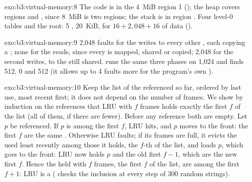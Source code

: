 \begin{solution}{exo:b3:virtual-memory:8}
The code is in the 4~MiB region 1 (); the heap covers regions  and , since 8~MiB is two regions; the stack is in region . Four level-0 tables and the root: 5 , 20~KiB, for $16 + 2{,}048 + 16$  of data ().
\end{solution}

\begin{solution}{exo:b3:virtual-memory:9}
2,048 faults for the writes to every other , each copying a ; none for the reads, since every  is mapped, shared or copied; 2,048 for the second writes, to the  still shared.  runs the same three phases on 1,024  and finds 512, 0 and 512 (it allows up to 4 faults more for the program's own ).
\end{solution}

\begin{solution}{exo:b3:virtual-memory:10}
Keep the list of the  referenced so far, ordered by last use, most recent first; it does not depend on the number of frames. We show by induction on the references that LRU with $f$ frames holds exactly the first $f$  of the list (all of them, if there are fewer). Before any reference both are empty. Let  $p$ be referenced. If $p$ is among the first $f$, LRU hits, and $p$ moves to the front: the first $f$ are the same . Otherwise LRU faults; if its frames are full, it evicts the  used least recently among those it holds, the $f$-th of the list, and loads $p$, which goes to the front: LRU now holds $p$ and the old first $f - 1$, which are the new first $f$. Hence the  held with $f$ frames, the first $f$ of the list, are among the first $f + 1$: LRU is a  ( checks the inclusion at every step of 300 random strings).
\end{solution}

